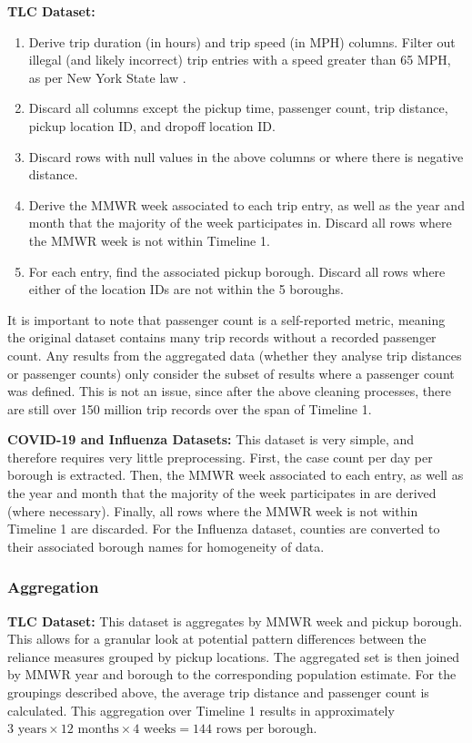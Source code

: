 \documentclass[11pt]{article}
\begin{document}
\textbf{TLC Dataset:}
\begin{multicols}{2}
    \begin{enumerate}
        \item Derive trip duration (in hours) and trip speed (in MPH) columns. 
        Filter out illegal (and likely incorrect) trip entries with a speed greater than 65 MPH, 
        as per New York State law \cite{laws}.
        \item Discard all columns except the pickup time, passenger count, trip distance, pickup location ID, and dropoff location ID.
        \item Discard rows with null values in the above columns or where there is negative distance.
        \item Derive the MMWR week associated to each trip entry, as well as the year and month that the majority of the week participates in.
        Discard all rows where the MMWR week is not within Timeline 1.
        \item For each entry, find the associated pickup borough. 
        Discard all rows where either of the location IDs are not within the 5 boroughs.
    \end{enumerate}
\end{multicols}
It is important to note that passenger count is a self-reported metric, 
meaning the original dataset contains many trip records without a recorded passenger count.
Any results from the aggregated data (whether they analyse trip distances or passenger counts) 
only consider the subset of results where a passenger count was defined.
This is not an issue, since after the above cleaning processes,
there are still over 150 million trip records over the span of Timeline 1.

\textbf{COVID-19 and Influenza Datasets:}
This dataset is very simple, and therefore requires very little preprocessing.
First, the case count per day per borough is extracted. 
Then, the MMWR week associated to each entry, as well as the year and month that the majority of the week participates in are derived (where necessary).
Finally, all rows where the MMWR week is not within Timeline 1 are discarded.
For the Influenza dataset, 
counties are converted to their associated borough names for homogeneity of data.

\subsubsection{Aggregation}

\textbf{TLC Dataset:}
This dataset is aggregates by MMWR week and pickup borough.
This allows for a granular look at potential pattern differences between the reliance measures grouped by pickup locations.
The aggregated set is then joined by MMWR year and borough to the corresponding population estimate.
For the groupings described above, 
the average trip distance and passenger count is calculated.
This aggregation over Timeline 1 results in approximately $3 \text{ years} \times 12 \text{ months} \times 4 \text{ weeks} = 144 \text{ rows per borough}$.
\end{document}
